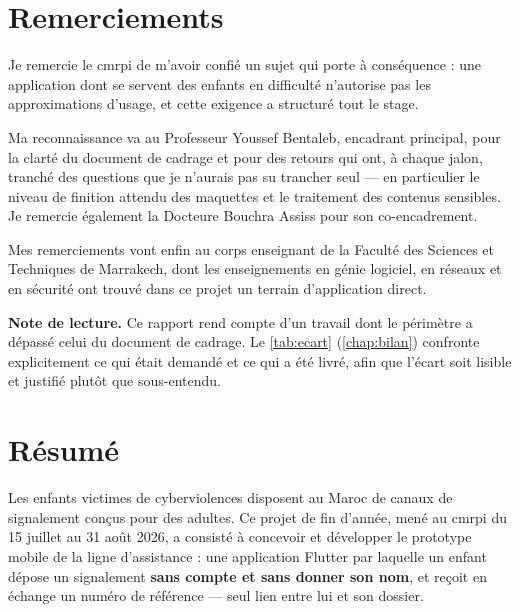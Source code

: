 \documentclass[11pt,a4paper,oneside,openany]{report}
\begin{document}
\setcounter{page}{1}

\chapter*{Remerciements}

Je remercie le \gls{cmrpi} de m'avoir confié un sujet qui porte à conséquence :
une application dont se servent des enfants en difficulté n'autorise pas les
approximations d'usage, et cette exigence a structuré tout le stage.

Ma reconnaissance va au Professeur Youssef Bentaleb, encadrant principal, pour
la clarté du document de cadrage et pour des retours qui ont, à chaque jalon,
tranché des questions que je n'aurais pas su trancher seul — en particulier le
niveau de finition attendu des maquettes et le traitement des contenus
sensibles. Je remercie également la Docteure Bouchra Assiss pour son
co-encadrement.

Mes remerciements vont enfin au corps enseignant de la Faculté des Sciences et
Techniques de Marrakech, dont les enseignements en génie logiciel, en réseaux et
en sécurité ont trouvé dans ce projet un terrain d'application direct.

\vspace{4mm}
\begin{constat}
\small\sffamily
\textbf{Note de lecture.} Ce rapport rend compte d'un travail dont le périmètre
a dépassé celui du document de cadrage. Le \cref{tab:ecart} 
(\cref{chap:bilan}) confronte explicitement ce qui était demandé et ce qui a
été livré, afin que l'écart soit lisible et justifié plutôt que sous-entendu.
\end{constat}

\chapter*{Résumé}

Les enfants victimes de cyberviolences disposent au Maroc de canaux de
signalement conçus pour des adultes. Ce projet de fin d'année, mené au
\gls{cmrpi} du 15 juillet au 31 août 2026, a consisté à concevoir et développer
le prototype mobile de la ligne d'assistance \emc : une application Flutter par
laquelle un enfant dépose un signalement \textbf{sans compte et sans donner son
nom}, et reçoit en échange un numéro de référence — seul lien entre lui et son
dossier.
\end{document}
